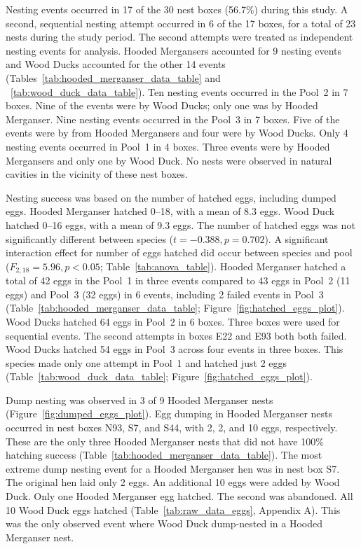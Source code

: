 Nesting events occurred in 17 of the 30 nest boxes (56.7\%) during this study. A second, sequential nesting attempt occurred in 6 of the 17 boxes, for a total of 23 nests during the study period. The second attempts were treated as independent nesting events for analysis. 
Hooded Mergansers accounted for 9 nesting events and Wood Ducks accounted for the other 14 events (Tables~\ref{tab:hooded_merganser_data_table} and ~\ref{tab:wood_duck_data_table}).  Ten nesting events occurred in the Pool~2 in 7 boxes. Nine of the events were by Wood Ducks; only one was by Hooded Merganser. Nine nesting events occurred in the Pool~3 in 7 boxes. Five of the events were by from Hooded Mergansers and four were by Wood Ducks. Only 4 nesting events occurred in Pool~1 in 4 boxes. Three events were by Hooded Mergansers and only one by Wood Duck. No nests were observed in natural cavities in the vicinity of these nest boxes.  





Nesting success was based on the number of hatched eggs, including dumped eggs. Hooded Merganser hatched \numrange[range-phrase = –]{0}{18}, with a mean of \num{8.3} eggs. Wood Duck hatched \numrange[range-phrase = –]{0}{16} eggs, with a mean of \num{9.3} eggs. The number of hatched eggs was not significantly different between species ($t = -0.388, p = 0.702$). A significant interaction effect for number of eggs hatched did occur between species and pool ($F_{2,18} = 5.96, p < 0.05$; Table~\ref{tab:anova_table}). Hooded Merganser hatched a total of 42 eggs in the Pool~1 in three events compared to 43 eggs in Pool~2 (11 eggs) and Pool~3 (32 eggs) in 6 events, including 2 failed events in Pool~3 (Table~\ref{tab:hooded_merganser_data_table}; Figure~\ref{fig:hatched_eggs_plot}). Wood Ducks hatched 64 eggs in Pool~2 in 6 boxes. Three boxes were used for sequential events. The second attempts in boxes E22 and E93 both both failed. Wood Ducks hatched 54 eggs in Pool~3 across four events in three boxes. This species made only one attempt in Pool~1 and hatched just 2 eggs (Table~\ref{tab:wood_duck_data_table}; Figure~\ref{fig:hatched_eggs_plot}). 



 

Dump nesting was observed in 3 of 9 Hooded Merganser nests (Figure~\ref{fig:dumped_eggs_plot}). Egg dumping in Hooded Merganser nests occurred in nest boxes N93, S7, and S44, with 2, 2, and 10 eggs, respectively. These are the only three Hooded Merganser nests that did not have 100\% hatching success (Table~\ref{tab:hooded_merganser_data_table}). The most extreme dump nesting event for a Hooded Merganser hen was in nest box S7. The original hen laid only 2 eggs. An additional 10 eggs were added by Wood Duck. Only one Hooded Merganser egg hatched. The second was abandoned. All 10 Wood Duck eggs hatched (Table~\ref{tab:raw_data_eggs}, Appendix A). This was the only observed event where Wood Duck dump-nested in a Hooded Merganser nest.

